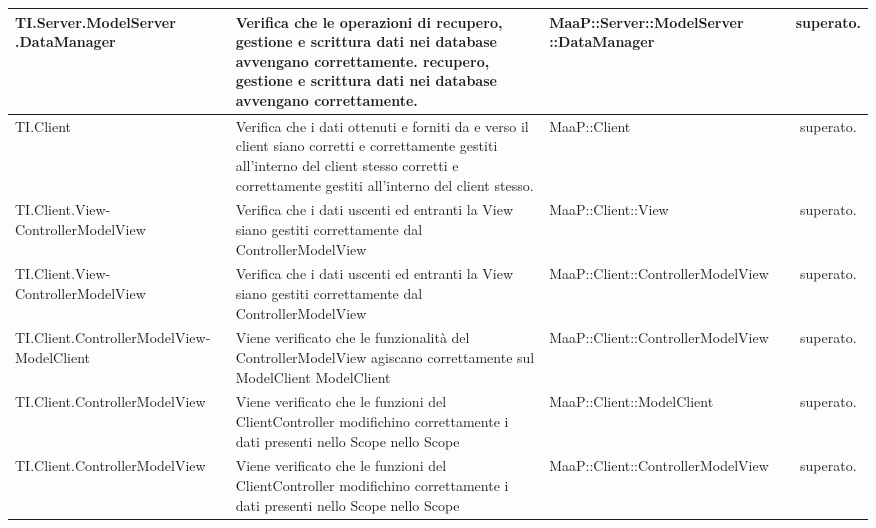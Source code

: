 \begin{center}
\begin{longtable}{|p{4.5cm}|p{3cm}|p{5.5cm}|c|}
\midrule
TI.Server.ModelServer .DataManager
& Verifica che le operazioni di recupero, gestione e scrittura dati nei database avvengano correttamente.
recupero, gestione e scrittura
dati nei database avvengano
correttamente.
& MaaP::Server::ModelServer ::DataManager
& superato.\\


\midrule
TI.Client
& Verifica che i dati ottenuti e forniti da e verso il client siano corretti e correttamente gestiti all'interno del client stesso
corretti e correttamente gestiti
all'interno del client stesso.
& MaaP::Client
& superato.\\


\midrule
TI.Client.View-ControllerModelView
& Verifica che i dati uscenti ed entranti la View siano gestiti correttamente dal ControllerModelView
& MaaP::Client::View
& superato.\\


\midrule
TI.Client.View-ControllerModelView
& Verifica che i dati uscenti ed entranti la View siano gestiti correttamente dal ControllerModelView
& MaaP::Client::ControllerModelView
& superato.\\


\midrule
TI.Client.ControllerModelView-ModelClient
& Viene verificato che le funzionalità del ControllerModelView agiscano correttamente sul ModelClient
ModelClient
& MaaP::Client::ControllerModelView
& superato.\\


\midrule
TI.Client.ControllerModelView
& Viene verificato che le funzioni del ClientController modifichino correttamente i dati presenti nello Scope
nello Scope
& MaaP::Client::ModelClient
& superato.\\


\midrule
TI.Client.ControllerModelView
& Viene verificato che le funzioni del ClientController modifichino correttamente i dati presenti nello Scope
nello Scope
& MaaP::Client::ControllerModelView
& superato.\\


\end{longtable}
\end{center}

